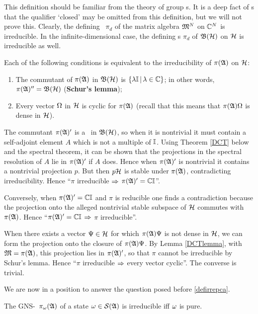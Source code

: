 This definition should be familiar from the theory of group \rep s.
It is a deep fact of \ca s that the qualifier `closed' may be omitted
from this definition, but we will not prove this.  Clearly, the
defining \rep\ $\pi_d$ of the matrix algebra ${\frak M}^N$ on ${\Bbb C}^N$ is
irreducible. In the infinite-dimensional case, the defining \rep s
$\pi_d$ of ${\frak B}({\cal H})$ on ${\cal H}$ is irreducible as well.
\begin{Proposition}
  Each of the following conditions is equivalent to the irreducibility
of $\pi({\frak A})$ on ${\cal H}$:
\begin{enumerate}
 \item The commutant of $\pi({\frak A})$ in ${\frak B}({\cal H})$ is $\{\lambda{\Bbb I}\, |\,
\lambda\in{\Bbb C}\}$; in other words, $\pi({\frak A})''={\frak B}({\cal H})$ ({\bf Schur's lemma});
\item
 Every vector $\Omega$ in ${\cal H}$ is cyclic for $\pi({\frak A})$ (recall that this
means that $\pi({\frak A})\Omega$ is dense in ${\cal H}$).
\end{enumerate} 
\end{Proposition}

The commutant $\pi({\frak A})'$ is a \sta\ in ${\frak B}({\cal H})$, so when it is nontrivial
it must contain a self-adjoint element $A$ which is not a multiple of
${\Bbb I}$. Using Theorem \ref{DCT} below and the spectral theorem, it can
be shown that the projections in the spectral resolution of $A$ lie in
$\pi({\frak A})'$ if $A$ does. Hence when $\pi({\frak A})'$ is nontrivial it
contains a nontrivial projection $p$. But then $p{\cal H}$ is stable under
$\pi({\frak A})$, contradicting irreducibility.  Hence ``$\pi$ irreducible
$\Rightarrow$ $\pi({\frak A})'={\Bbb C}{\Bbb I}$''.

Conversely, when $\pi({\frak A})'={\Bbb C}{\Bbb I}$ and $\pi$ is reducible one finds a
contradiction because the projection onto the alleged nontrivial
stable subspace of ${\cal H}$ commutes with $\pi({\frak A})$. Hence
``$\pi({\frak A})'={\Bbb C}{\Bbb I}$ $\Rightarrow$ $\pi$ irreducible''.

When there exists a vector $\Psi\in{\cal H}$ for which $\pi({\frak A})\Psi$ is not
dense in ${\cal H}$, we can form the projection onto the closure of
$\pi({\frak A})\Psi$. By Lemma \ref{DCTlemma}, with ${\frak M}=\pi({\frak A})$, this
projection lies in $\pi({\frak A})'$, so that $\pi$ cannot be irreducible by
Schur's lemma.  Hence ``$\pi$ irreducible $\Rightarrow$ every vector
cyclic''.  The converse is trivial.\enp

We are now in a position to answer the question posed before
\ref{defirrepca}.
\begin{Theorem}
The GNS-\rep\ $\pi_{\omega}({\frak A})$ of a state $\omega\in{\cal S}({\frak A})$ is irreducible
iff $\omega$ is pure.
\end{Theorem}

